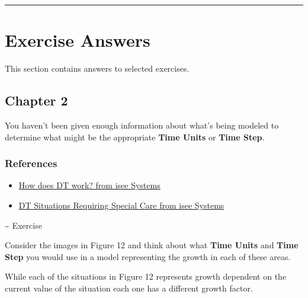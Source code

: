 \documentclass[]{memoir}
\renewcommand{\u}[1]{\textbf{#1}}
\begin{document}
\begin{center}\rule{3in}{0.4pt}\end{center}

\chapter{Exercise Answers}

This section contains answers to selected exercises.

\section{Chapter 2}


You haven't been given enough information about what's being modeled to
determine what might be the appropriate \u{Time Units} or \u{Time Step}.

\subsection{References}

\begin{itemize}
\itemsep1pt\parskip0pt
\item
  \href{http://www.iseesystems.com/Helpv9/Content/DT/How_does_DT_work_.htm}{How
  does DT work? from isee Systems}
\item
  \href{http://www.iseesystems.com/Helpv9/Content/DT/DT_Special_Care.htm}{DT
  Situations Requiring Special Care from isee Systems}
\end{itemize}

\textasciitilde{} Exercise

Consider the images in Figure 12 and think about what \u{Time Units} and
\u{Time Step} you would use in a model representing the growth in each
of these areas.


While each of the situations in Figure 12 represents growth dependent on
the current value of the situation each one has a different growth
factor.
\end{document}
